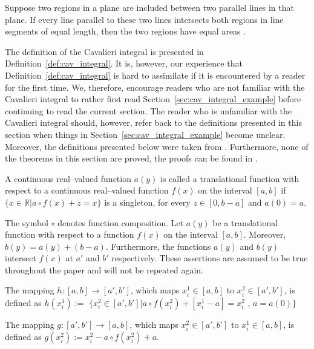 \documentclass[twoside,reqno,11pt]{fcaa-var} %
\begin{document}
\begin{theorem}
Suppose two regions in a plane are included between two parallel lines in that plane. If every line parallel to these two lines intersects both regions in line segments of equal length, then the two regions have equal areas \cite{ackermann12}. 
\end{theorem}

\noindent
The definition of the Cavalieri integral is presented in Definition~\ref{def:cav_integral}. It is, however, our experience that Definition~\ref{def:cav_integral} is hard to assimilate if it is encountered by a reader for the first time. We, therefore, encourage readers who are not familiar with the Cavalieri integral to rather first read Section~\ref{sec:cav_integral_example} before continuing to read the current section. The reader who is unfamiliar with the Cavalieri integral should, however, refer back to the definitions presented in this section when things in Section~\ref{sec:cav_integral_example} become unclear. Moreover, the definitions presented below were taken from \cite{ackermann12}. Furthermore, none of the theorems in this section are proved, the proofs can be found in \cite{ackermann12,grobler19}.

\begin{definition}\label{def:trans}
A continuous real--valued function $a(y)$ is called a translational function with respect to a continuous real--valued function $f(x)$ on the interval $[a,b]$ if 
$\{x\in\mathbb{R}|a\circ f(x) + z = x\}$ is a singleton, for every $z\in[0,b-a]$ and $a(0) = a$.
\end{definition}

\noindent
The symbol $\circ$ denotes function composition. Let $a(y)$ be a translational function with respect to a function $f(x)$ on the interval $[a,b]$. Moreover, $b(y) = a(y) + (b-a)$. Furthermore, the functions $a(y)$ and $b(y)$ intersect $f(x)$ at $a'$ and $b'$ respectively. These assertions are assumed to be true throughout the paper and will not be repeated again.

\begin{definition}\label{def:h}
The mapping $h : [a, b] \rightarrow [a',b']$, which maps $x_i^1 \in [a, b]$ to $x_i^2 \in [a',b']$, is defined as
$h(x_i^1) :=$ $\{x_i^2 \in [a' ,b'] | a\circ f(x_i^2) + [x_i^1 - a] = x_i^2$ , $a = a(0)\}$
\end{definition}

\begin{definition}\label{def:g}
The mapping $g:[a', b'] \rightarrow [a, b]$, which maps $x_i^2 \in [a' , b']$ to $x_i^1\in [a, b]$,
is defined as $g(x_i^2) := x_i^2 - a \circ f (x_i^2) + a$.
\end{definition}
\end{document}
